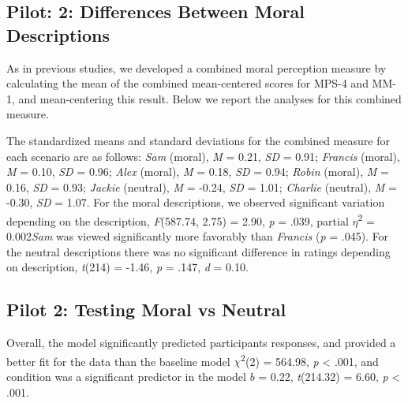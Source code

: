 \documentclass[
  american,
  man,floatsintext]{apa7}
\begin{document}
\hypertarget{pilot-2-differences-between-moral-descriptions}{%
\subsection{Pilot: 2: Differences Between Moral Descriptions}\label{pilot-2-differences-between-moral-descriptions}}

As in previous studies, we developed a combined moral perception measure by calculating the mean of the combined mean-centered scores for MPS-4 and MM-1, and mean-centering this result. Below we report the analyses for this combined measure.

The standardized means and standard deviations for the combined measure for each scenario are as follows:
\emph{Sam} (moral),
\emph{M} = 0.21, \emph{SD} = 0.91;
\emph{Francis} (moral),
\emph{M} = 0.10, \emph{SD} = 0.96;
\emph{Alex} (moral),
\emph{M} = 0.18, \emph{SD} = 0.94;
\emph{Robin} (moral),
\emph{M} = 0.16, \emph{SD} = 0.93;
\emph{Jackie} (neutral),
\emph{M} = -0.24, \emph{SD} = 1.01;
\emph{Charlie} (neutral),
\emph{M} = -0.30, \emph{SD} = 1.07. For the moral descriptions, we observed significant variation depending on the description, \emph{F}(587.74, 2.75) = 2.90, \emph{p} = .039, partial \(\eta\)\textsuperscript{2} = 0.002\emph{Sam} was viewed significantly more favorably than \emph{Francis} (\emph{p} = .045). For the neutral descriptions there was no significant difference in ratings depending on description, \emph{t}(214) = -1.46, \emph{p} = .147, \emph{d} = 0.10.

\hypertarget{pilot-2-testing-moral-vs-neutral}{%
\subsection{Pilot 2: Testing Moral vs Neutral}\label{pilot-2-testing-moral-vs-neutral}}

Overall, the model significantly predicted participants responses, and provided a better fit for the data than the baseline model \(\chi\)\textsuperscript{2}(2) = 564.98, \emph{p} \textless{} .001, and condition was a significant predictor in the model \(b\) = 0.22, \emph{t}(214.32) = 6.60, \emph{p} \textless{} .001.
\end{document}
